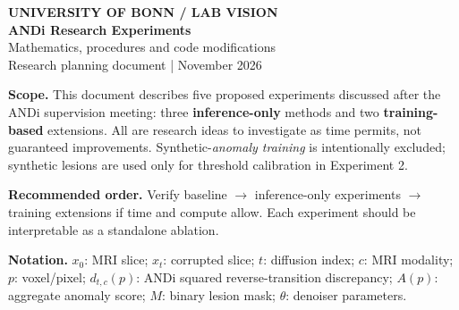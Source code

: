 \documentclass[10pt,a4paper]{article}
\begin{document}
\begin{flushleft}
{\color{blue}\textbf{UNIVERSITY OF BONN \; / \; LAB VISION}}\\[9pt]
{\Huge\bfseries\color{navy} ANDi Research Experiments}\\[7pt]
{\Large\color{slate} Mathematics, procedures and code modifications}\\[11pt]
{\small\color{slate} Research planning document \quad |  November 2026}
\end{flushleft}
\vspace{4mm}
\begin{summarybox}
\textbf{Scope.} This document describes five proposed experiments discussed after the ANDi supervision meeting: three \textbf{inference-only} methods and two \textbf{training-based} extensions. All are research ideas to investigate as time permits, not guaranteed improvements. Synthetic-\emph{anomaly training} is intentionally excluded; synthetic lesions are used only for threshold calibration in Experiment 2.\par
\textbf{Recommended order.} Verify baseline $\rightarrow$ inference-only experiments $\rightarrow$ training extensions if time and compute allow. Each experiment should be interpretable as a standalone ablation.
\end{summarybox}
\vspace{2mm}
\begin{center}
\end{center}
\vspace{2mm}
\textbf{Notation.} $x_0$: MRI slice; $x_t$: corrupted slice; $t$: diffusion index; $c$: MRI modality; $p$: voxel/pixel; $d_{t,c}(p)$: ANDi squared reverse-transition discrepancy; $A(p)$: aggregate anomaly score; $M$: binary lesion mask; $\theta$: denoiser parameters.
\newpage
\end{document}
